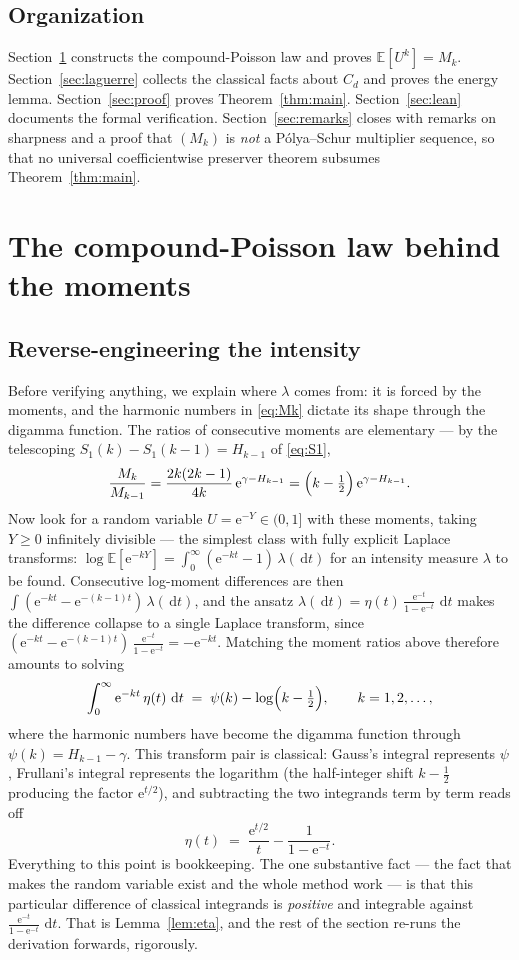 \documentclass[11pt]{amsart}
\theoremstyle{definition}
\theoremstyle{remark}
\newcommand{\dd}{\,\mathrm{d}}
\newcommand{\e}{\mathrm{e}}
\newcommand{\E}{\mathbb{E}}
\begin{document}
\subsection*{Organization} Section~\ref{sec:moments} constructs the
compound-Poisson law and proves $\E[U^k]=M_k$.
Section~\ref{sec:laguerre} collects the classical facts about $C_d$
and proves the energy lemma. Section~\ref{sec:proof} proves
Theorem~\ref{thm:main}. Section~\ref{sec:lean} documents the formal
verification. Section~\ref{sec:remarks} closes with remarks on
sharpness and a proof that $(M_k)$ is \emph{not} a P\'olya--Schur
multiplier sequence, so that no universal coefficientwise preserver
theorem subsumes Theorem~\ref{thm:main}.

\section{The compound-Poisson law behind the moments}\label{sec:moments}

\subsection*{Reverse-engineering the intensity}
Before verifying anything, we explain where $\lambda$ comes from:
it is forced by the moments, and the harmonic numbers in
\eqref{eq:Mk} dictate its shape through the digamma function. The
ratios of consecutive moments are elementary --- by the telescoping
$S_1(k)-S_1(k-1)=H_{k-1}$ of \eqref{eq:S1},
\[
\frac{M_k}{M_{k-1}}
=\frac{2k(2k-1)}{4k}\,\e^{\gamma-H_{k-1}}
=\Bigl(k-\tfrac12\Bigr)\,\e^{\gamma-H_{k-1}} .
\]
Now look for a random variable $U=\e^{-Y}\in(0,1]$ with these moments,
taking $Y\ge0$ infinitely divisible --- the simplest class with fully
explicit Laplace transforms: $\log\E[\e^{-kY}]
=\int_0^\infty(\e^{-kt}-1)\,\lambda(\dd t)$ for an intensity measure
$\lambda$ to be found. Consecutive log-moment differences are then
$\int(\e^{-kt}-\e^{-(k-1)t})\,\lambda(\dd t)$, and the ansatz
$\lambda(\dd t)=\eta(t)\,\frac{\e^{-t}}{1-\e^{-t}}\,\dd t$ makes the
difference collapse to a single Laplace transform, since
$(\e^{-kt}-\e^{-(k-1)t})\,\frac{\e^{-t}}{1-\e^{-t}}=-\e^{-kt}$.
Matching the moment ratios above therefore amounts to solving
\[
\int_0^\infty \e^{-kt}\,\eta(t)\,\dd t
\;=\;\psi(k)-\log\Bigl(k-\tfrac12\Bigr),
\qquad k=1,2,\dots,
\]
where the harmonic numbers have become the digamma function through
$\psi(k)=H_{k-1}-\gamma$. This transform pair is classical: Gauss's
integral represents $\psi$, Frullani's integral represents the
logarithm (the half-integer shift $k-\tfrac12$ producing the factor
$\e^{t/2}$), and subtracting the two integrands term by term reads off
\[
\eta(t)\;=\;\frac{\e^{t/2}}{t}-\frac{1}{1-\e^{-t}} .
\]
Everything to this point is bookkeeping. The one substantive fact ---
the fact that makes the random variable exist and the whole method
work --- is that this particular difference of classical integrands is
\emph{positive} and integrable against
$\frac{\e^{-t}}{1-\e^{-t}}\,\dd t$. That is Lemma~\ref{lem:eta}, and
the rest of the section re-runs the derivation forwards, rigorously.
\end{document}
